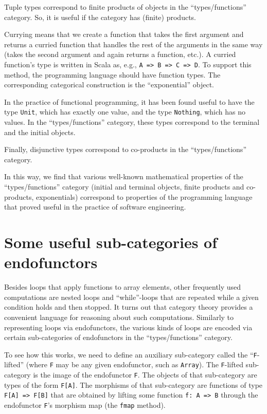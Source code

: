 Tuple types correspond to finite products of objects in the \textsf{``}types/functions\textsf{''}
category. So, it is useful if the category has (finite) products. 

Currying means that we create a function that takes the first argument
and returns a curried function that handles the rest of the arguments
in the same way (takes the second argument and again returns a function,
etc.). A curried function\textsf{'}s type is written in Scala as, e.g., \lstinline!A => B => C => D!.
To support this method, the programming language should have function
types. The corresponding categorical construction is the \textsf{``}exponential\textsf{''}
object. 

In the practice of functional programming, it has been found useful
to have the type \lstinline!Unit!, which has exactly one value, and
the type \lstinline!Nothing!, which has no values. In the \textsf{``}types/functions\textsf{''}
category, these types correspond to the terminal and the initial objects.

Finally, disjunctive types correspond to co-products in the \textsf{``}types/functions\textsf{''}
category.

In this way, we find that various well-known mathematical properties
of the \textsf{``}types/functions\textsf{''} category (initial and terminal objects,
finite products and co-products, exponentials) correspond to properties
of the programming language that proved useful in the practice of
software engineering.

\section{Some useful sub-categories of endofunctors}

Besides loops that apply functions to array elements, other frequently
used computations are nested loops and \textsf{``}while\textsf{''}-loops that are
repeated while a given condition holds and then stopped. It turns
out that category theory provides a convenient language for reasoning
about such computations. Similarly to representing loops via endofunctors,
the various kinds of loops are encoded via certain sub-categories
of endofunctors in the \textsf{``}types/functions\textsf{''} category.

To see how this works, we need to define an auxiliary sub-category
called the \textsf{``}\lstinline!F!-lifted\textsf{''} (where \lstinline!F! may be
any given endofunctor, such as \lstinline!Array!). The \lstinline!F!-lifted
sub-category is the image of the endofunctor \lstinline!F!. The objects
of that sub-category are types of the form \lstinline!F[A]!. The
morphisms of that sub-category are functions of type \lstinline!F[A] => F[B]!
that are obtained by lifting some function \lstinline!f: A => B!
through the endofunctor \lstinline!F!\textsf{'}s morphism map (the \lstinline!fmap!
method). 

